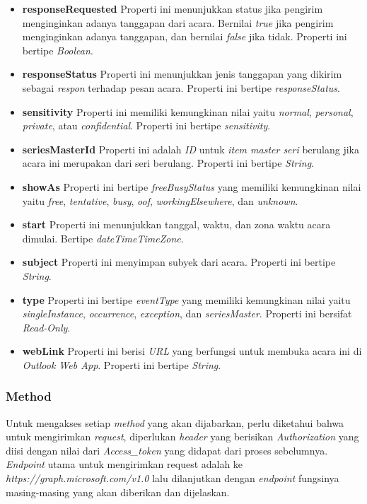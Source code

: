 \begin{itemize}
	\item \textbf{responseRequested}
	Properti ini menunjukkan status jika pengirim menginginkan adanya tanggapan dari acara. Bernilai \textit{true} jika pengirim menginginkan adanya tanggapan, dan bernilai \textit{false} jika tidak. Properti ini bertipe \textit{Boolean}.  
	\item \textbf{responseStatus}
	Properti ini menunjukkan jenis tanggapan yang dikirim sebagai \textit{respon} terhadap pesan acara. Properti ini bertipe \textit{responseStatus}. 
	\item \textbf{sensitivity}
	Properti ini memiliki kemungkinan nilai yaitu \textit{normal}, \textit{personal}, \textit{private}, atau \textit{confidential}. Properti ini bertipe \textit{sensitivity}. 
	\item \textbf{seriesMasterId}
	Properti ini adalah \textit{ID} untuk \textit{item master seri} berulang jika acara ini merupakan dari seri berulang. Properti ini bertipe \textit{String}.  
	\item \textbf{showAs}
	Properti ini bertipe \textit{freeBusyStatus} yang memiliki kemungkinan nilai yaitu \textit{free}, \textit{tentative}, \textit{busy}, \textit{oof}, \textit{workingElsewhere}, dan \textit{unknown}. 
	\item \textbf{start}
	Properti ini menunjukkan tanggal, waktu, dan zona waktu acara dimulai. Bertipe \textit{dateTimeTimeZone}. 
	\item \textbf{subject}
	Properti ini menyimpan subyek dari acara. Properti ini bertipe \textit{String}. 
	\item \textbf{type}
	Properti ini bertipe \textit{eventType} yang memiliki kemungkinan nilai yaitu \textit{singleInstance}, \textit{occurrence}, \textit{exception}, dan \textit{seriesMaster}. Properti ini bersifat \textit{Read-Only}. 
	\item \textbf{webLink}
	Properti ini berisi \textit{URL} yang berfungsi untuk membuka acara ini di \textit{Outlook Web App}. Properti ini bertipe \textit{String}. 
\end{itemize}

\subsubsection{Method}
Untuk mengakses setiap \textit{method} yang akan dijabarkan, perlu diketahui bahwa untuk mengirimkan \textit{request}, diperlukan \textit{header} yang berisikan \textit{Authorization} yang diisi dengan nilai dari \textit{Access\_token} yang didapat dari proses sebelumnya. \textit{Endpoint} utama untuk mengirimkan request adalah ke \textit{https://graph.microsoft.com/v1.0} lalu dilanjutkan dengan \textit{endpoint} fungsinya masing-masing yang akan diberikan dan dijelaskan. 

